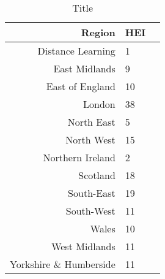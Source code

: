 \begin{table}[ht]
\centering
\caption{Title} 
\label{table:HEIreg}
\begin{tabular}{rlr}
  \hline
 Region & HEI \\ 
  \hline
Distance Learning &   1 \\ 
  East Midlands &   9 \\ 
  East of England &  10 \\ 
  London &  38 \\ 
  North East &   5 \\ 
  North West &  15 \\ 
  Northern Ireland &   2 \\ 
  Scotland &  18 \\ 
  South-East &  19 \\ 
  South-West &  11 \\ 
  Wales &  10 \\ 
  West Midlands &  11 \\ 
  Yorkshire \& Humberside &  11 \\ 
   \hline
\end{tabular}
\label{table:HEIperregion}
\end{table}